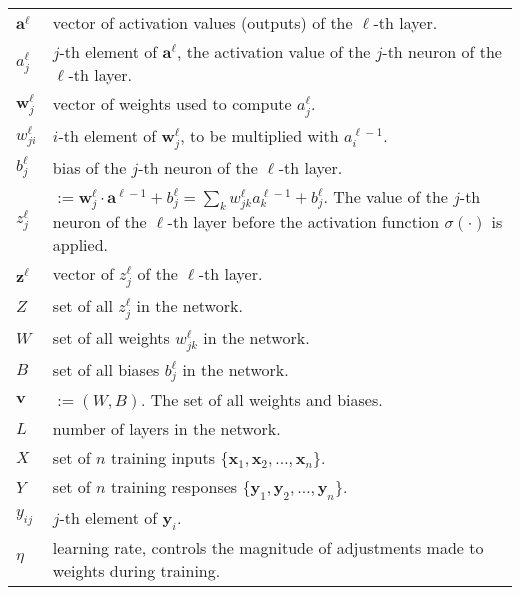\begin{tabular}{p{1cm}p{13cm}}
$\mathbf{a}^\ell$ & vector of activation values (outputs) of the $\ell$-th layer.\\
$a_j^\ell$ & $j$-th element of $\mathbf{a}^\ell$, the activation value of the $j$-th neuron of the $\ell$-th layer.\\
$\mathbf{w}^\ell_j$ & vector of weights used to compute $a_j^\ell$.\\
$w_{ji}^\ell$ & $i$-th element of $\mathbf{w}^\ell_j$, to be multiplied with $a_i^{\ell-1}$.\\
$b_j^\ell$ & bias of the $j$-th neuron of the $\ell$-th layer.\\
$z_j^\ell$ & $:= \mathbf{w}_j^\ell\cdot \mathbf{a}^{\ell-1} + b_j^\ell= \sum_k w_{jk}^\ell a_k^{\ell-1} + b_j^\ell$. The value of the $j$-th neuron of the $\ell$-th layer before the activation function $\sigma(\cdot)$ is applied.\\
$\mathbf{z}^\ell$ & vector of $z_j^\ell$ of the $\ell$-th layer.\\
$Z$ & set of all $z_j^\ell$ in the network. \\
$W$ & set of all weights $w_{jk}^\ell$ in the network.\\
$B$ & set of all biases $b_j^\ell$ in the network. \\
$\mathbf{v}$ & $:= (W,B)$. The set of all weights and biases.\\
$L$ & number of layers in the network.\\
$X$ & set of $n$ training inputs $\{\mathbf{x}_1, \mathbf{x}_2, \ldots, \mathbf{x}_n\}$. \\
$Y$ & set of $n$ training responses $\{\mathbf{y}_1, \mathbf{y}_2, \ldots, \mathbf{y}_n\}$.\\
$y_{ij}$ &  $j$-th element of $\mathbf{y}_i$.\\
$\eta$ & learning rate, controls the magnitude of adjustments made to weights during training.
\end{tabular}



